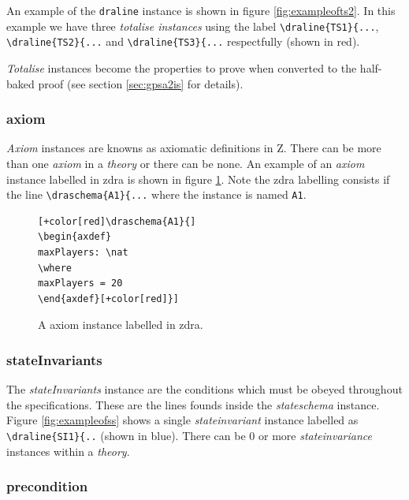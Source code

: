 An example of the \verb|draline| instance is shown in figure \ref{fig:exampleofts2}. In this example we have three \emph{totalise instances} using the label \verb|\draline{TS1}{...|, \verb|\draline{TS2}{...| and \verb|\draline{TS3}{...| respectfully (shown in red).

\emph{Totalise} instances become the properties to prove when converted to the half-baked proof (see section \ref{sec:gpsa2is} for details).


\subsubsection{axiom}

\emph{Axiom} instances are knowns as axiomatic definitions in Z. There can be more than one \emph{axiom} in a \emph{theory} or there can be none. An example of an \emph{axiom} instance labelled in \gls{zdra} is shown in figure \ref{fig:exampleofa}. Note the \gls{zdra} labelling consists if the line \verb|\draschema{A1}{...| where the instance is named \verb|A1|.

\begin{figure}[H]
\centering
\begin{footnotesize}
\begin{BVerbatim}[commandchars=+\[\]]
[+color[red]\draschema{A1}{]
\begin{axdef}
maxPlayers: \nat
\where
maxPlayers = 20
\end{axdef}[+color[red]}]
\end{BVerbatim}
\end{footnotesize}
\caption{\label{fig:exampleofa} A axiom instance labelled in \gls{zdra}.}
\end{figure}

\subsubsection{stateInvariants}
The \emph{stateInvariants} instance are the conditions which must be obeyed throughout the specifications. These are the lines founds inside the \emph{stateschema} instance. Figure \ref{fig:exampleofss} shows a single \emph{stateinvariant} instance labelled as \verb|\draline{SI1}{..| (shown in blue). There can be 0 or more \emph{stateinvariance} instances within a \emph{theory}.

\subsubsection{precondition}

